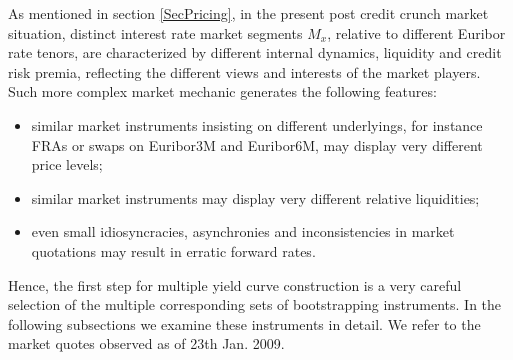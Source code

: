 \documentclass[11pt,reqno]{amsart}
\begin{document}
As mentioned in section \ref{SecPricing}, in the present post credit crunch market situation, distinct interest rate market segments $M_x$, relative to different Euribor rate tenors, are characterized by different internal dynamics, liquidity and credit risk premia, reflecting the different views and interests of the market players. 
Such more complex market mechanic generates the following features:
\begin{itemize}
\item similar market instruments insisting on different underlyings, for instance FRAs or swaps on Euribor3M and Euribor6M, may display very different price levels;
\item similar market instruments may display very different relative liquidities;
\item even small idiosyncracies, asynchronies and inconsistencies in market quotations may result in erratic forward rates.
\end{itemize}
Hence, the first step for multiple yield curve construction is a very careful selection of the multiple corresponding sets of bootstrapping instruments. In the following subsections we examine these instruments in detail. We refer to the market quotes observed as of 23th Jan. 2009.
\end{document}
